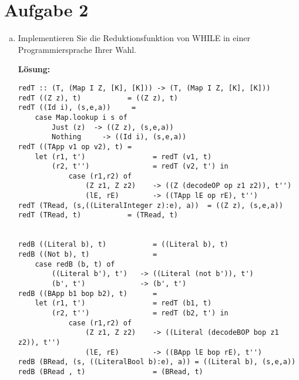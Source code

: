 \documentclass[11pt,a4paper,ngerman]{article}
\begin{document}
\section*{Aufgabe 2}
\begin{enumerate}[a)]
    \item   Implementieren Sie die Reduktionsfunktion von WHILE in einer Programmiersprache
            Ihrer Wahl.

            \textbf{Lösung:}\\
            \begin{lstlisting}
redT :: (T, (Map I Z, [K], [K])) -> (T, (Map I Z, [K], [K]))
redT ((Z z), t)           = ((Z z), t)
redT ((Id i), (s,e,a))     = 
    case Map.lookup i s of
        Just (z)  -> ((Z z), (s,e,a))
        Nothing     -> ((Id i), (s,e,a))
redT ((TApp v1 op v2), t) =
    let (r1, t')                = redT (v1, t)
        (r2, t'')               = redT (v2, t') in
            case (r1,r2) of
                (Z z1, Z z2)    -> ((Z (decodeOP op z1 z2)), t'')
                (lE, rE)        -> ((TApp lE op rE), t'')
redT (TRead, (s,((LiteralInteger z):e), a))  = ((Z z), (s,e,a))
redT (TRead, t)           = (TRead, t)
        

redB ((Literal b), t)           = ((Literal b), t)
redB ((Not b), t)               = 
    case redB (b, t) of
        ((Literal b'), t')   -> ((Literal (not b')), t')
        (b', t')             -> (b', t')
redB ((BApp b1 bop b2), t)      =
    let (r1, t')                = redT (b1, t)
        (r2, t'')               = redT (b2, t') in
            case (r1,r2) of
                (Z z1, Z z2)    -> ((Literal (decodeBOP bop z1 z2)), t'')
                (lE, rE)        -> ((BApp lE bop rE), t'')
redB (BRead, (s, ((LiteralBool b):e), a)) = ((Literal b), (s,e,a))
redB (BRead , t)                = (BRead, t)


\end{lstlisting}
\end{enumerate}
\end{document}
